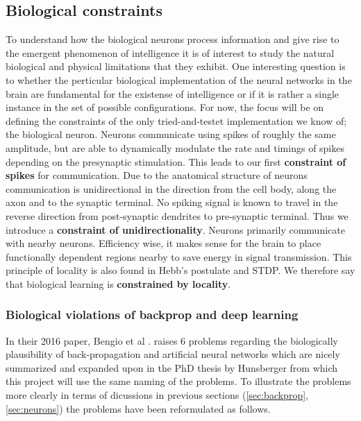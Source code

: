 \documentclass[a4paper,11pt]{article} %
\begin{document}
\subsection{Biological constraints} \label{sec:biological-constraints}
To understand how the biological neurons process information and give rise to the emergent phenomenon of intelligence it is of interest to study the natural biological and physical limitations that they exhibit. One interesting question is to whether the perticular biological implementation of the neural networks in the brain are fundamental for the existense of intelligence or if it is rather a single instance in the set of possible configurations. For now, the focus will be on defining the constraints of the only tried-and-testet implementation we know of; the biological neuron. Neurons communicate using spikes of roughly the same amplitude, but are able to dynamically modulate the rate and timings of spikes depending on the presynaptic stimulation. This leads to our first \textbf{constraint of spikes} for communication. Due to the anatomical structure of neurons communication is unidirectional in the direction from the cell body, along the axon and to the synaptic terminal. No spiking signal is known to travel in the reverse direction from post-synaptic dendrites to pre-synaptic terminal. Thus we introduce a \textbf{constraint of unidirectionality}. Neurons primarily communicate with nearby neurons. Efficiency wise, it makes sense for the brain to place functionally dependent regions nearby to save energy in signal transmission. This principle of locality is also found in Hebb's postulate and STDP. We therefore say that biological learning is \textbf{constrained by locality}.

\subsubsection{Biological violations of backprop and deep learning}
In their 2016 paper, Bengio et al \cite{BengioLBL15}. raises 6 problems regarding the biologically plausibility of back-propagation and artificial neural networks which are nicely summarized and expanded upon in the PhD thesis by Hunsberger \cite{Eric2018} from which this project will use the same naming of the problems. To illustrate the problems more clearly in terms of dicussions in previous sections (\ref{sec:backprop}, \ref{sec:neurons}) the problems have been reformulated as follows.
\end{document}

